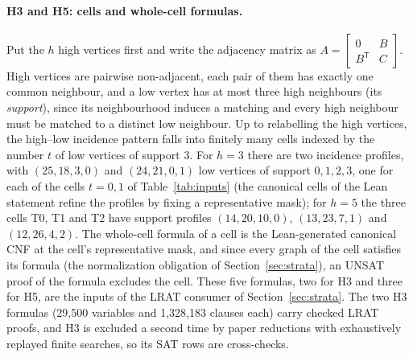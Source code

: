 \documentclass{anvil-paper}
\theoremstyle{definition}
\begin{document}
\paragraph{H3 and H5: cells and whole-cell formulas.} Put the $h$ high vertices first and write the adjacency matrix as $A=\left[\begin{smallmatrix}0&B\\B^{\mathsf T}&C\end{smallmatrix}\right]$. High vertices are pairwise non-adjacent, each pair of them has exactly one common neighbour, and a low vertex has at most three high neighbours (its \emph{support}), since its neighbourhood induces a matching and every high neighbour must be matched to a distinct low neighbour. Up to relabelling the high vertices, the high--low incidence pattern falls into finitely many cells indexed by the number $t$ of low vertices of support 3. For $h=3$ there are two incidence profiles, with $(25,18,3,0)$ and $(24,21,0,1)$ low vertices of support $0,1,2,3$, one for each of the cells $t=0,1$ of Table~\ref{tab:inputs} (the canonical cells of the Lean statement refine the profiles by fixing a representative mask); for $h=5$ the three cells T0, T1 and T2 have support profiles $(14,20,10,0)$, $(13,23,7,1)$ and $(12,26,4,2)$. The whole-cell formula of a cell is the Lean-generated canonical CNF at the cell's representative mask, and since every graph of the cell satisfies its formula (the normalization obligation of Section~\ref{sec:strata}), an UNSAT proof of the formula excludes the cell. These five formulas, two for H3 and three for H5, are the inputs of the LRAT consumer of Section~\ref{sec:strata}. The two H3 formulas (29,500 variables and 1,328,183 clauses each) carry checked LRAT proofs, and H3 is excluded a second time by paper reductions with exhaustively replayed finite searches, so its SAT rows are cross-checks.
\end{document}
